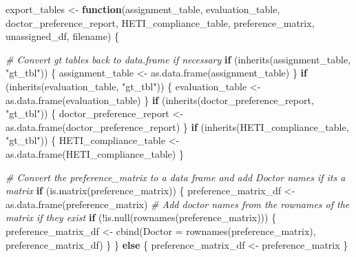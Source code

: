 \documentclass[
]{article}
\newenvironment{Shaded}{\begin{snugshade}}{\end{snugshade}}
\newcommand{\AttributeTok}[1]{\textcolor[rgb]{0.77,0.63,0.00}{#1}}
\newcommand{\CommentTok}[1]{\textcolor[rgb]{0.56,0.35,0.01}{\textit{#1}}}
\newcommand{\ControlFlowTok}[1]{\textcolor[rgb]{0.13,0.29,0.53}{\textbf{#1}}}
\newcommand{\FunctionTok}[1]{\textcolor[rgb]{0.00,0.00,0.00}{#1}}
\newcommand{\NormalTok}[1]{#1}
\newcommand{\OtherTok}[1]{\textcolor[rgb]{0.56,0.35,0.01}{#1}}
\newcommand{\SpecialCharTok}[1]{\textcolor[rgb]{0.00,0.00,0.00}{#1}}
\newcommand{\StringTok}[1]{\textcolor[rgb]{0.31,0.60,0.02}{#1}}
\begin{document}
\begin{Shaded}
\begin{Highlighting}[]
\NormalTok{export\_tables }\OtherTok{\textless{}{-}} \ControlFlowTok{function}\NormalTok{(assignment\_table, evaluation\_table, doctor\_preference\_report, HETI\_compliance\_table, preference\_matrix, unassigned\_df, filename) \{}
  
  \CommentTok{\# Convert gt tables back to data.frame if necessary}
  \ControlFlowTok{if}\NormalTok{ (}\FunctionTok{inherits}\NormalTok{(assignment\_table, }\StringTok{"gt\_tbl"}\NormalTok{)) \{}
\NormalTok{    assignment\_table }\OtherTok{\textless{}{-}} \FunctionTok{as.data.frame}\NormalTok{(assignment\_table)}
\NormalTok{  \}}
  \ControlFlowTok{if}\NormalTok{ (}\FunctionTok{inherits}\NormalTok{(evaluation\_table, }\StringTok{"gt\_tbl"}\NormalTok{)) \{}
\NormalTok{    evaluation\_table }\OtherTok{\textless{}{-}} \FunctionTok{as.data.frame}\NormalTok{(evaluation\_table)}
\NormalTok{  \}}
  \ControlFlowTok{if}\NormalTok{ (}\FunctionTok{inherits}\NormalTok{(doctor\_preference\_report, }\StringTok{"gt\_tbl"}\NormalTok{)) \{}
\NormalTok{    doctor\_preference\_report }\OtherTok{\textless{}{-}} \FunctionTok{as.data.frame}\NormalTok{(doctor\_preference\_report)}
\NormalTok{  \}}
  \ControlFlowTok{if}\NormalTok{ (}\FunctionTok{inherits}\NormalTok{(HETI\_compliance\_table, }\StringTok{"gt\_tbl"}\NormalTok{)) \{}
\NormalTok{    HETI\_compliance\_table }\OtherTok{\textless{}{-}} \FunctionTok{as.data.frame}\NormalTok{(HETI\_compliance\_table)}
\NormalTok{  \}}
  
  \CommentTok{\# Convert the preference\_matrix to a data frame and add Doctor names if it\textquotesingle{}s a matrix}
  \ControlFlowTok{if}\NormalTok{ (}\FunctionTok{is.matrix}\NormalTok{(preference\_matrix)) \{}
\NormalTok{    preference\_matrix\_df }\OtherTok{\textless{}{-}} \FunctionTok{as.data.frame}\NormalTok{(preference\_matrix)}
    \CommentTok{\# Add doctor names from the rownames of the matrix if they exist}
    \ControlFlowTok{if}\NormalTok{ (}\SpecialCharTok{!}\FunctionTok{is.null}\NormalTok{(}\FunctionTok{rownames}\NormalTok{(preference\_matrix))) \{}
\NormalTok{      preference\_matrix\_df }\OtherTok{\textless{}{-}} \FunctionTok{cbind}\NormalTok{(}\AttributeTok{Doctor =} \FunctionTok{rownames}\NormalTok{(preference\_matrix), preference\_matrix\_df)}
\NormalTok{    \}}
\NormalTok{  \} }\ControlFlowTok{else}\NormalTok{ \{}
\NormalTok{    preference\_matrix\_df }\OtherTok{\textless{}{-}}\NormalTok{ preference\_matrix}
\NormalTok{  \}}
  

\end{Highlighting}
\end{Shaded}
\end{document}
